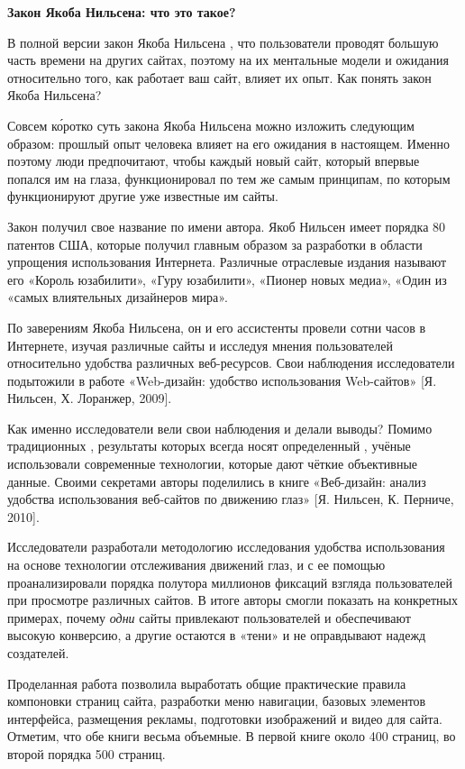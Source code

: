 \textbf{Закон Якоба Нильсена: что это такое?}

В полной версии закон Якоба Нильсена , что пользователи проводят большую часть времени на других сайтах, поэтому на их ментальные модели и ожидания относительно того, как работает ваш сайт, влияет их  опыт. Как понять закон Якоба Нильсена?

Совсем к\'{о}ротко суть закона Якоба Нильсена можно изложить следующим образом: прошлый опыт человека влияет на его ожидания в настоящем. Именно поэтому люди предпочитают, чтобы каждый новый сайт, который впервые попался им на глаза, функционировал по тем же самым принципам, по которым функционируют другие уже известные им сайты.

Закон получил свое название по имени автора. Якоб Нильсен имеет порядка 80 патентов США, которые получил главным образом за разработки в области упрощения использования Интернета. Различные отраслевые издания называют его «Король юзабилити», «Гуру юзабилити», «Пионер новых медиа», «Один из «самых влиятельных дизайнеров мира».

По заверениям Якоба Нильсена, он и его ассистенты провели сотни часов в Интернете, изучая различные сайты и исследуя мнения пользователей относительно удобства различных веб-ресурсов. Свои наблюдения исследователи подытожили в работе «Web-дизайн: удобство использования Web-сайтов» [Я. Нильсен, Х. Лоранжер, 2009].

Как именно исследователи вели свои наблюдения и делали выводы? Помимо традиционных , результаты которых всегда носят определенный , учёные использовали современные технологии, которые дают чёткие объективные данные. Своими секретами авторы поделились в книге «Веб-дизайн: анализ удобства использования веб-сайтов по движению глаз» [Я. Нильсен, К. Перниче, 2010].

Исследователи разработали методологию исследования удобства использования на основе технологии отслеживания движений глаз, и с ее помощью проанализировали порядка полутора миллионов фиксаций взгляда пользователей при просмотре различных сайтов. В итоге авторы смогли  показать на конкретных примерах, почему \textit{одни} сайты привлекают пользователей и обеспечивают высокую конверсию, а другие остаются в «тени» и не оправдывают надежд создателей.

Проделанная работа позволила выработать общие практические правила компоновки страниц сайта, разработки меню навигации, базовых элементов интерфейса, размещения рекламы, подготовки изображений и видео для сайта. Отметим, что обе книги весьма объемные. В первой книге около 400 страниц, во второй порядка 500 страниц.

